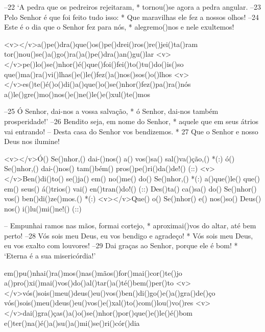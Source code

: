 –22 ‘A pedra que os pedreiros rejeitaram, *
tornou()se agora a pedra angular.
–23 Pelo Senhor é que foi feito tudo isso: *
Que maravilhas ele fez a nossos olhos!
–24 Este é o dia que o Senhor fez para nós, *
alegremo()nos e nele exultemos!

<v></v>a()pe()dra()que()os()pe()drei()ros()re()jei()ta()ram
tor()nou()se()a()go()ra()a()pe()dra()an()gu()lar
<v></v>pe()lo()se()nhor()é()que()foi()fei()to()tu()do()is()so
que()ma()ra()vi()lhas()e()le()fez()a()nos()sos()o()lhos
<v></v>es()te()é()o()di()a()que()o()se()nhor()fez()pa()ra()nós
a()le()gre()mo()nos()e()ne()le()e()xul()te()mos

–25 Ó Senhor, dai-nos a vossa salvação, *
ó Senhor, dai-nos também prosperidade!’
–26 Bendito seja, em nome do Senhor, *
aquele que em seus átrios vai entrando!
– Desta casa do Senhor vos bendizemos. *
27 Que o Senhor e nosso Deus nos ilumine!

<v></v>Ó() Se()nhor,() dai-()nos() a() vos()sa() sal()va()ção,() *(:)
ó() Se()nhor,() dai-()nos() tam()bém() pros()pe()ri()da()de!() (::)
<v></v>Ben()di()to() se()ja() em() no()me() do() Se()nhor,() *(:)
a()que()le() que() em() seus() á()trios() vai() en()tran()do!() (::)
Des()ta() ca()sa() do() Se()nhor() vos() ben()di()ze()mos.() *(:)
<v></v>Que() o() Se()nhor() e() nos()so() Deus() nos() i()lu()mi()ne!() (::)

– Empunhai ramos nas mãos, formai cortejo, *
aproximai()vos do altar, até bem perto!
–28 Vós sois meu Deus, eu vos bendigo e agradeço! *
Vós sois meu Deus, eu vos exalto com louvores!
–29 Dai graças ao Senhor, porque ele é bom! *
‘Eterna é a sua misericórdia!’

em()pu()nhai()ra()mos()nas()mãos()for()mai()cor()te()jo
a()pro()xi()mai()vos()do()al()tar()a()té()bem()per()to
<v></v>vós()sois()meu()deus()eu()vos()ben()di()go()e()a()gra()de()ço
vós()sois()meu()deus()eu()vos()e()xal()to()com()lou()vo()res
<v></v>dai()gra()ças()a()o()se()nhor()por()que()e()le()é()bom
e()ter()na()é()a()su()a()mi()se()ri()cór()dia